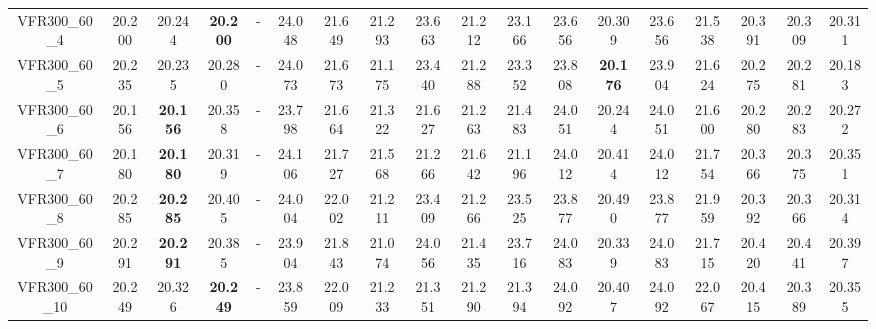 \begin{tabular}{cc|ccc|ccccccccccccc}
VFR300\_60\_4      & 20.200           & 20.244           & {\bf 20.200}     & -                & 24.048           & 21.649           & 21.293           & 23.663           & 21.212           & 23.166           & 23.656           & 20.309           & 23.656           & 21.538           & 20.391           & 20.309           & 20.311          \\ 
VFR300\_60\_5      & 20.235           & 20.235           & 20.280           & -                & 24.073           & 21.673           & 21.175           & 23.440           & 21.288           & 23.352           & 23.808           & {\bf 20.176}     & 23.904           & 21.624           & 20.275           & 20.281           & 20.183          \\ 
VFR300\_60\_6      & 20.156           & {\bf 20.156}     & 20.358           & -                & 23.798           & 21.664           & 21.322           & 21.627           & 21.263           & 21.483           & 24.051           & 20.244           & 24.051           & 21.600           & 20.280           & 20.283           & 20.272          \\ 
VFR300\_60\_7      & 20.180           & {\bf 20.180}     & 20.319           & -                & 24.106           & 21.727           & 21.568           & 21.266           & 21.642           & 21.196           & 24.012           & 20.414           & 24.012           & 21.754           & 20.366           & 20.375           & 20.351          \\ 
VFR300\_60\_8      & 20.285           & {\bf 20.285}     & 20.405           & -                & 24.004           & 22.002           & 21.211           & 23.409           & 21.266           & 23.525           & 23.877           & 20.490           & 23.877           & 21.959           & 20.392           & 20.366           & 20.314          \\ 
VFR300\_60\_9      & 20.291           & {\bf 20.291}     & 20.385           & -                & 23.904           & 21.843           & 21.074           & 24.056           & 21.435           & 23.716           & 24.083           & 20.339           & 24.083           & 21.715           & 20.420           & 20.441           & 20.397          \\ 
VFR300\_60\_10     & 20.249           & 20.326           & {\bf 20.249}     & -                & 23.859           & 22.009           & 21.233           & 21.351           & 21.290           & 21.394           & 24.092           & 20.407           & 24.092           & 22.067           & 20.415           & 20.389           & 20.355          \\ 

\end{tabular}
